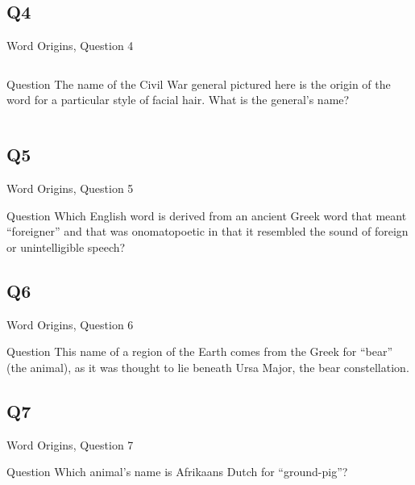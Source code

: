 \documentclass[11pt]{beamer}
\begin{document}
\subsection*{Q4}
\begin{frame}[t]{Word Origins, Question 4}
\begin{columns}[T,totalwidth=\linewidth]
\begin{column}{0.32\linewidth}
\begin{block}{Question}
The name of the Civil War general pictured here is the origin of the word for a particular style of facial hair. What is the general's name?
\end{block}
\end{column}
\begin{column}{0.65\linewidth}
\begin{center}
\texttt{[image: \{Images/burnsides]}.jpg}
\end{center}
\end{column}
\end{columns}
\end{frame}
\subsection*{Q5}
\begin{frame}[t]{Word Origins, Question 5}
\begin{block}{Question}
Which English word is derived from an ancient Greek word that meant ``foreigner'' and that was onomatopoetic in that it resembled the sound of foreign or unintelligible speech?
\end{block}
\end{frame}
\subsection*{Q6}
\begin{frame}[t]{Word Origins, Question 6}
\begin{block}{Question}
This name of a region of the Earth comes from the Greek for ``bear'' (the animal), as it was thought to lie beneath Ursa Major, the bear constellation.
\end{block}
\end{frame}
\subsection*{Q7}
\begin{frame}[t]{Word Origins, Question 7}
\begin{block}{Question}
Which animal's name is Afrikaans Dutch for ``ground-pig''?
\end{block}
\end{frame}
\end{document}
